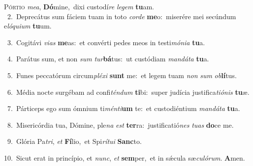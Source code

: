 \lettrine{\initial\textcolor{\initialcolor}{P}}{órtio} \textit{me}\-\textit{a}, \textbf{Dó}\-mine,~\star dixi custodí\textit{re} \textit{le}\-\textit{gem} \textbf{tu}\-am.\\
{\numbfont\textcolor{\numbcolor}{~2.}}~Deprecátus sum fáciem tuam in toto \textit{cor}\-\textit{de} \textbf{me}\-o:~\star miserére mei secúndum e\-\textit{ló}\-\textit{qui}\textit{um} \textbf{tu}\-um.\par
{\numbfont\textcolor{\numbcolor}{~3.}}~Cogitávi \textit{vi}\-\textit{as} \textbf{me}\-as:~\star et convérti pedes meos in testi\-\textit{mó}\-\textit{ni}\textit{a} \textbf{tu}\-a.\par
{\numbfont\textcolor{\numbcolor}{~4.}}~Parátus sum, et non \textit{sum} \textit{tur}\-\textbf{bá}tus:~\star ut custódiam \textit{man}\-\textit{dá}\textit{ta} \textbf{tu}\-a.\par
{\numbfont\textcolor{\numbcolor}{~5.}}~Funes peccatórum circum\-\textit{plé}\-\textit{xi} \textbf{sunt} me:~\star et legem tuam \textit{non} \textit{sum} \textit{ob}\-\textbf{lí}tus.\par
{\numbfont\textcolor{\numbcolor}{~6.}}~Média nocte surgébam ad confi\-\textit{tén}\-\textit{dum} \textbf{ti}\-bi:~\star super judícia justifica\-\textit{ti}\-\textit{ó}\textit{nis} \textbf{tu}\-æ.\par
{\numbfont\textcolor{\numbcolor}{~7.}}~Párticeps ego sum ómnium ti\-\textit{mén}\-\textit{ti}\textbf{um} te:~\star et custodiéntium \textit{man}\-\textit{dá}\textit{ta} \textbf{tu}\-a.\par
{\numbfont\textcolor{\numbcolor}{~8.}}~Misericórdia tua, Dómine, ple\textit{na} \textit{est} \textbf{ter}\-ra:~\star justificatió\textit{nes} \textit{tu}\-\textit{as} \textbf{do}\-ce me.\par
{\numbfont\textcolor{\numbcolor}{~9.}}~Glória Pa\-\textit{tri}\-, \textit{et} \textbf{Fí}\-lio,~\star et Spi\-\textit{rí}\-\textit{tu}\textit{i} \textbf{Sanc}\-to.\par
{\numbfont\textcolor{\numbcolor}{10.}}~Sicut erat in princípio, et \textit{nunc}\-, \textit{et} \textbf{sem}\-per,~\star et in sǽcula sæ\-\textit{cu}\-\textit{ló}\textit{rum}. \textbf{A}\-men.\par
